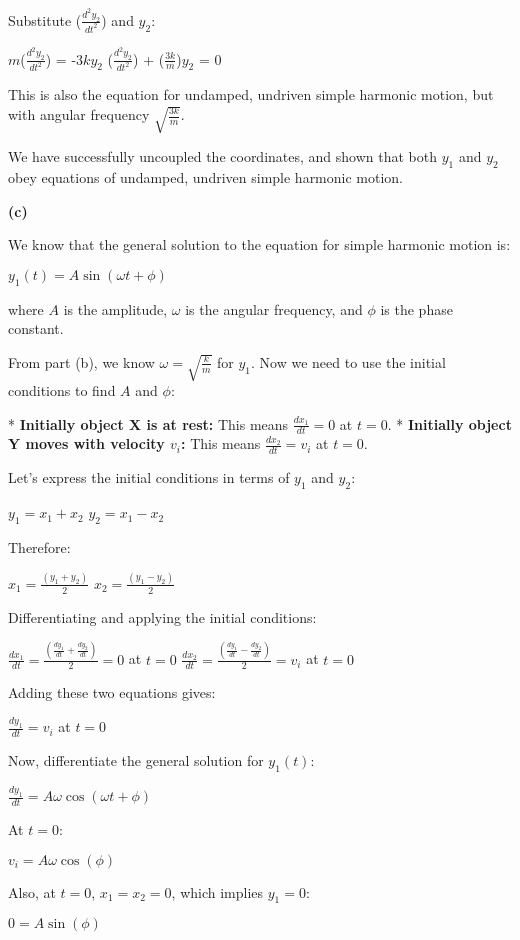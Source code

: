 \documentclass{article}
\begin{document}
Substitute ($\frac{d^2 y_2}{d t^2}$) and $y_2$:

$m$($\frac{d^2 y_2}{d t^2}$) = -$3k y_2$
($\frac{d^2 y_2}{d t^2}$) + ($\frac{3k}{m}$)$y_2$ = 0

This is also the equation for undamped, undriven simple harmonic motion, but with angular frequency $\sqrt{\frac{3k}{m}}$.

We have successfully uncoupled the coordinates, and shown that both $y_1$ and $y_2$ obey equations of undamped, undriven simple harmonic motion.


\textbf{(c)}

We know that the general solution to the equation for simple harmonic motion is:

$y_1(t) = A \sin(\omega t + \phi)$ 

where $A$ is the amplitude, $\omega$ is the angular frequency, and $\phi$ is the phase constant.

From part (b), we know $\omega = \sqrt{\frac{k}{m}}$ for $y_1$. Now we need to use the initial conditions to find $A$ and $\phi$:

* \textbf{Initially object X is at rest:} This means $\frac{dx_1}{dt} = 0$ at $t = 0$.
* \textbf{Initially object Y moves with velocity $v_i$:} This means $\frac{dx_2}{dt} = v_i$ at $t = 0$.

Let's express the initial conditions in terms of $y_1$ and $y_2$:

$y_1 = x_1 + x_2$
$y_2 = x_1 - x_2$

Therefore:

$x_1 = \frac{(y_1 + y_2)}{2}$
$x_2 = \frac{(y_1 - y_2)}{2}$

Differentiating and applying the initial conditions:

$\frac{dx_1}{dt} = \frac{(\frac{dy_1}{dt} + \frac{dy_2}{dt})}{2} = 0$  at $t = 0$
$\frac{dx_2}{dt} = \frac{(\frac{dy_1}{dt} - \frac{dy_2}{dt})}{2} = v_i$ at $t = 0$

Adding these two equations gives:

$\frac{dy_1}{dt} = v_i$ at $t = 0$

Now, differentiate the general solution for $y_1(t)$:

$\frac{dy_1}{dt} = A\omega \cos(\omega t + \phi)$

At $t = 0$:

$v_i = A\omega \cos(\phi)$

Also, at $t = 0$, $x_1 = x_2 = 0$, which implies $y_1 = 0$:

$0 = A \sin(\phi)$
\end{document}
